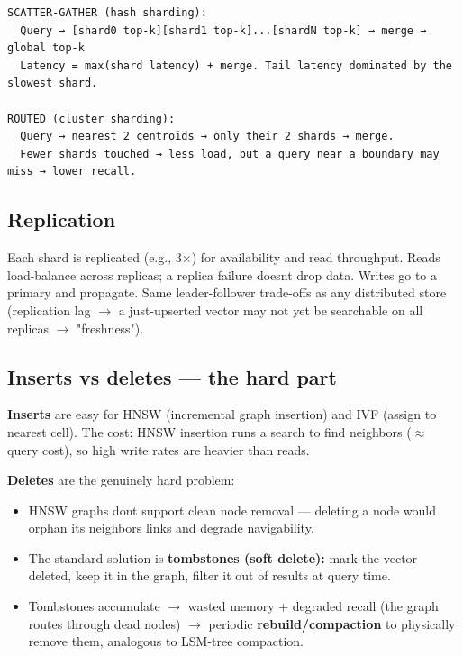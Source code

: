 \documentclass[11pt]{article}
\providecommand{\tightlist}{\setlength{\itemsep}{1pt}\setlength{\parskip}{0pt}}
\begin{document}
\setcodelang{}

\begin{verbatim}
SCATTER-GATHER (hash sharding):
  Query → [shard0 top-k][shard1 top-k]...[shardN top-k] → merge → global top-k
  Latency = max(shard latency) + merge. Tail latency dominated by the slowest shard.

ROUTED (cluster sharding):
  Query → nearest 2 centroids → only their 2 shards → merge.
  Fewer shards touched → less load, but a query near a boundary may miss → lower recall.
\end{verbatim}

\subsection{Replication}\label{replication}

Each shard is replicated (e.g., 3\(\times\)) for availability and read throughput. Reads load-balance across replicas; a replica failure doesn\textquotesingle t drop data. Writes go to a primary and propagate. Same leader-follower trade-offs as any distributed store (replication lag \(\rightarrow\) a just-upserted vector may not yet be searchable on all replicas \(\rightarrow\) "freshness").

\subsection{Inserts vs deletes --- the hard part}\label{inserts-vs-deletes--the-hard-part}

\textbf{Inserts} are easy for HNSW (incremental graph insertion) and IVF (assign to nearest cell). The cost: HNSW insertion runs a search to find neighbors (\(\approx\) query cost), so high write rates are heavier than reads.

\textbf{Deletes} are the genuinely hard problem:

\begin{itemize}
\tightlist
\item
  HNSW graphs don\textquotesingle t support clean node removal --- deleting a node would orphan its neighbors\textquotesingle{} links and degrade navigability.
\item
  The standard solution is \textbf{tombstones (soft delete):} mark the vector deleted, keep it in the graph, filter it out of results at query time.
\item
  Tombstones accumulate \(\rightarrow\) wasted memory + degraded recall (the graph routes through dead nodes) \(\rightarrow\) periodic \textbf{rebuild/compaction} to physically remove them, analogous to LSM-tree compaction.
\end{itemize}
\end{document}
